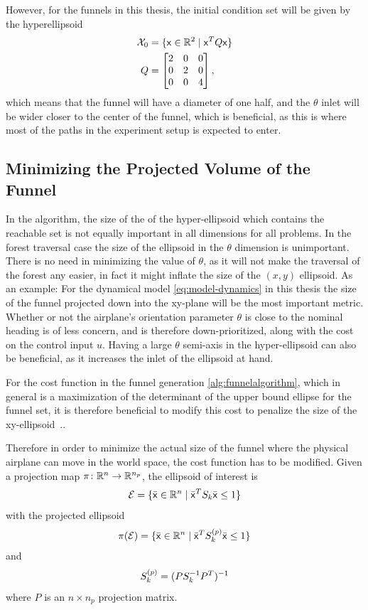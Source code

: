 However, for the funnels in this thesis, the initial condition set will be given
by the hyperellipsoid
\begin{align}
  \mathcal{X}_0 &= \lbrace{\mathbf{\mathsf{x}}} \in \mathbb{R}^2 \mid {\mathbf{\mathsf{x}}}^{T} Q {\mathbf{\mathsf{x}}}\rbrace \\
  Q &= \begin{bmatrix}
    2 & 0 & 0 \\
    0 & 2 & 0 \\
    0 & 0 & 4
  \end{bmatrix},
\end{align}
which means that the funnel will have a diameter of one half, and the \(\theta\)
inlet will be wider closer to the center of the funnel, which is beneficial, as
this is where most of the paths in the experiment setup is expected to enter.

\subsection{Minimizing the Projected Volume of the Funnel}
\label{subsec:xy-cost-function}

In the \rrtfunnel{} algorithm, the size of the of the hyper-ellipsoid which
contains the reachable set is not equally important in all dimensions for all
problems. In the forest traversal case the size of the ellipsoid in the
\(\theta\) dimension is unimportant. There is no need in minimizing the value of
\(\theta\), as it will not make the traversal of the forest any easier, in fact
it might inflate the size of the \((x,y)\) ellipsoid. As an example: For the
dynamical model \eqref{eq:model-dynamics} in this thesis the size of the funnel
projected down into the xy-plane will be the most important metric. Whether or
not the airplane's orientation parameter \(\theta\) is close to the nominal
heading is of less concern, and is therefore down-prioritized, along with the
cost on the control input \(u\). Having a large \(\theta\) semi-axis in the
hyper-ellipsoid can also be beneficial, as it increases the inlet of the
ellipsoid at hand.

For the cost function in the funnel generation \cref{alg:funnelalgorithm}, which
in general is a maximization of the determinant of the upper bound ellipse for
the funnel set, it is therefore beneficial to modify this cost to penalize the
size of the xy-ellipsoid~\cite{majumdarRobustOnlineMotion2013}..

Therefore in order to minimize the actual size of the funnel where the physical
airplane can move in the world space, the cost function has to be modified.
Given a projection map \(\pi \colon \mathbb{R}^n \rightarrow \mathbb{R}^{n_p}\), the ellipsoid
of interest is
\[
  \mathcal{E} = \lbrace\bar{{\mathbf{\mathsf{x}}}} \in \mathbb{R}^n \mid
    \bar{{\mathbf{\mathsf{x}}}}^TS_{k}\bar{{\mathbf{\mathsf{x}}}} \leq 1\rbrace
\]
with the projected ellipsoid
\[
  \pi(\mathcal{E}) = \lbrace\bar{{\mathbf{\mathsf{x}}}} \in \mathbb{R}^n \mid
    \bar{{\mathbf{\mathsf{x}}}}^TS^{(p)}_{k}\bar{{\mathbf{\mathsf{x}}}} \leq 1\rbrace
\]
and
\[
  S_k^{(p)} = \lparen PS_k^{-1}P^T\rparen^{-1}
\]
where \(P\) is an \(n\times n_p\) projection matrix.

